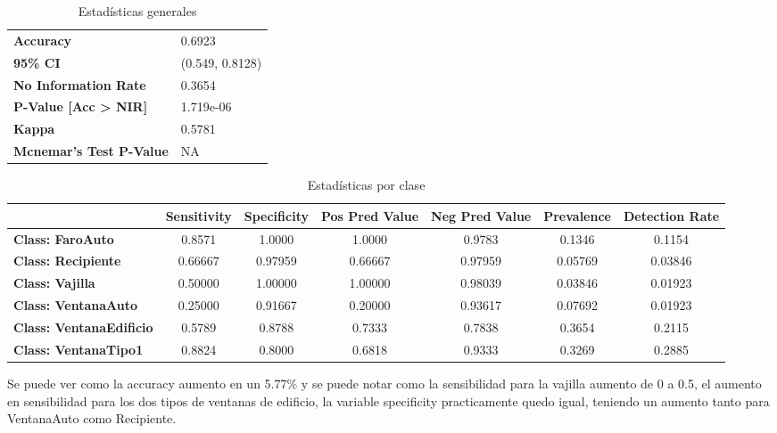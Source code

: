 \begin{table}[H]
  \centering

    \begin{tabular}{ll}
    \hline
    \textbf{Accuracy} & 0.6923 \\
    \textbf{95\% CI} & (0.549, 0.8128) \\
    \textbf{No Information Rate} & 0.3654 \\
    \textbf{P-Value [Acc > NIR]} & 1.719e-06 \\
    \textbf{Kappa} & 0.5781 \\
    \textbf{Mcnemar's Test P-Value} & NA \\
    \hline
    \end{tabular}%
      \caption{Estadísticas generales}
  \label{tab:overall_staats}%
\end{table}%

\begin{table}[H]
  \centering

    \begin{tabular}{lcccccc}
    \hline
          & \textbf{Sensitivity} & \textbf{Specificity} & \textbf{Pos Pred Value} & \textbf{Neg Pred Value} & \textbf{Prevalence} & \textbf{Detection Rate} \\
    \hline
    \textbf{Class: FaroAuto} & 0.8571 & 1.0000 & 1.0000 & 0.9783 & 0.1346 & 0.1154 \\
    \textbf{Class: Recipiente} & 0.66667 & 0.97959 & 0.66667 & 0.97959 & 0.05769 & 0.03846 \\
    \textbf{Class: Vajilla} & 0.50000 & 1.00000 & 1.00000 & 0.98039 & 0.03846 & 0.01923 \\
    \textbf{Class: VentanaAuto} & 0.25000 & 0.91667 & 0.20000 & 0.93617 & 0.07692 & 0.01923 \\
    \textbf{Class: VentanaEdificio} & 0.5789 & 0.8788 & 0.7333 & 0.7838 & 0.3654 & 0.2115 \\
    \textbf{Class: VentanaTipo1} & 0.8824 & 0.8000 & 0.6818 & 0.9333 & 0.3269 & 0.2885 \\
    \hline
    \end{tabular}%
      \caption{Estadísticas por clase}
  \label{tab:class_astats}%
\end{table}%
Se puede ver como la accuracy aumento en un 5.77$\%$ y se puede notar como la sensibilidad para la vajilla aumento de 0 a 0.5, el aumento en sensibilidad para los dos tipos de ventanas de edificio, la variable specificity practicamente quedo igual, teniendo un aumento tanto para VentanaAuto como Recipiente.
